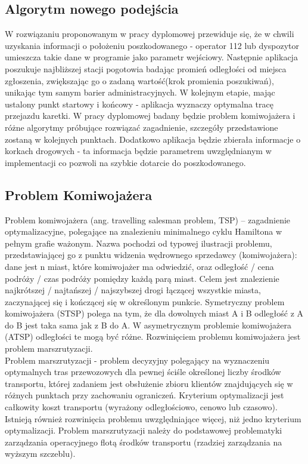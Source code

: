 \documentclass[12pt]{article} %
\begin{document}
\subsection{Algorytm nowego podejścia}
W rozwiązaniu proponowanym w pracy dyplomowej przewiduje się, że w chwili uzyskania informacji o położeniu poszkodowanego - operator 112 lub dyspozytor umieszcza takie dane w programie jako parametr wejściowy. Następnie aplikacja poszukuje najbliższej stacji pogotowia   badając promień odległości od miejsca zgłoszenia, zwiększając go o zadaną wartość(krok promienia poszukiwań), unikając tym samym barier administracyjnych. W kolejnym etapie, mając ustalony punkt startowy i końcowy - aplikacja wyznaczy optymalna tracę przejazdu karetki. W pracy dyplomowej badany będzie problem komiwojażera i różne algorytmy próbujące rozwiązać zagadnienie, szczegóły przedstawione zostaną w kolejnych punktach. Dodatkowo aplikacja będzie zbierała informacje o korkach drogowych - ta informacja będzie parametrem uwzględnianym w implementacji co pozwoli  na szybkie dotarcie do poszkodowanego.

\subsection{Problem Komiwojażera}
Problem komiwojażera (ang. travelling salesman problem, TSP) – zagadnienie optymalizacyjne, polegające na znalezieniu minimalnego cyklu Hamiltona w pełnym grafie ważonym.
Nazwa pochodzi od typowej ilustracji problemu, przedstawiającej go z punktu widzenia wędrownego sprzedawcy (komiwojażera): dane jest n miast, które komiwojażer ma odwiedzić, oraz odległość / cena podróży / czas podróży pomiędzy każdą parą miast. Celem jest znalezienie najkrótszej / najtańszej / najszybszej drogi łączącej wszystkie miasta, zaczynającej się i kończącej się w określonym punkcie.
Symetryczny problem komiwojażera (STSP) polega na tym, że dla dowolnych miast A i B odległość z A do B jest taka sama jak z B do A. W asymetrycznym problemie komiwojażera (ATSP) odległości te mogą być różne.
Rozwinięciem problemu komiwojażera jest problem marszrutyzacji.\\

Problem marszrutyzacji - problem decyzyjny polegający na wyznaczeniu optymalnych tras przewozowych dla pewnej ściśle określonej liczby środków transportu, której zadaniem jest obsłużenie zbioru klientów znajdujących się w różnych punktach przy zachowaniu ograniczeń. Kryterium optymalizacji jest całkowity koszt transportu (wyrażony odległościowo, cenowo lub czasowo). Istnieją również rozwinięcia problemu uwzględniające więcej, niż jedno kryterium optymalizacji. Problem marszrutyzacji należy do podstawowej problematyki zarządzania operacyjnego flotą środków transportu (rzadziej zarządzania na wyższym szczeblu).
\end{document}
